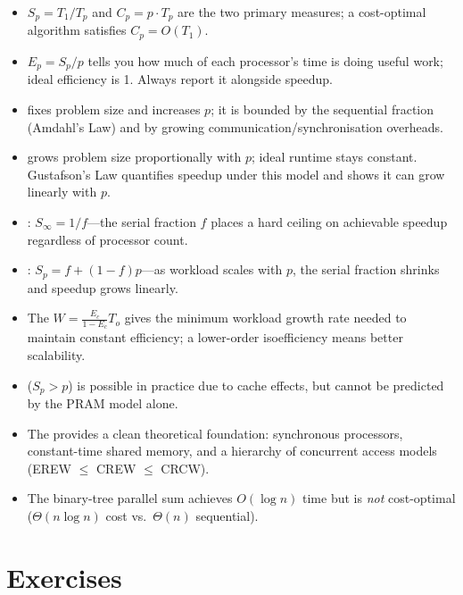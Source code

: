 \begin{itemize}
  \item {} $S_p = T_1/T_p$ and  $C_p = p \cdot T_p$
        are the two primary measures; a cost-optimal algorithm satisfies
        $C_p = O(T_1)$.
  \item {} $E_p = S_p/p$ tells you how much of each processor's
        time is doing useful work; ideal efficiency is 1. Always report it
        alongside speedup.
  \item {} fixes problem size and increases $p$; it
        is bounded by the sequential fraction (Amdahl's Law) and by growing
        communication/synchronisation overheads.
  \item {} grows problem size proportionally with $p$;
        ideal runtime stays constant. Gustafson's Law quantifies speedup under
        this model and shows it can grow linearly with $p$.
  \item {}: $S_\infty = 1/f$---the serial fraction $f$
        places a hard ceiling on achievable speedup regardless of processor count.
  \item {}: $S_p = f + (1-f)p$---as workload scales
        with $p$, the serial fraction shrinks and speedup grows linearly.
  \item The  $W = \frac{E_c}{1-E_c} T_o$ gives
        the minimum workload growth rate needed to maintain constant efficiency;
        a lower-order isoefficiency means better scalability.
  \item {} ($S_p > p$) is possible in practice due
        to cache effects, but cannot be predicted by the PRAM model alone.
  \item The  provides a clean theoretical foundation:
        synchronous processors, constant-time shared memory, and a hierarchy of
        concurrent access models (EREW $\leq$ CREW $\leq$ CRCW).
  \item The binary-tree parallel sum achieves $O(\log n)$ time but is
        \emph{not} cost-optimal ($\Theta(n \log n)$ cost vs.\ $\Theta(n)$
        sequential).
\end{itemize}

\section{Exercises}

